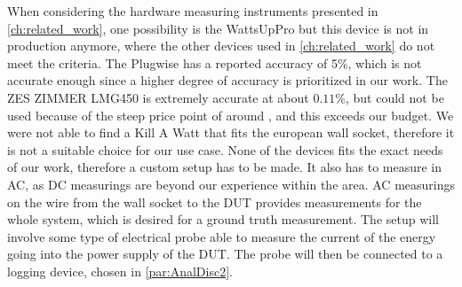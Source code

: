 When considering the hardware measuring instruments presented in \cref{ch:related_work}, one possibility is the WattsUpPro but this device is not in production anymore, where the other devices used in \cref{ch:related_work} do not meet the criteria. The Plugwise has a reported accuracy of 5\%\cite{PlugWise}, which is not accurate enough since a higher degree of accuracy is prioritized in our work. The ZES ZIMMER LMG450 is extremely accurate at about $0.11\%$\cite{hackenberg2013}, but could not be used because of the steep price point of around , and this exceeds our budget. We were not able to find a Kill A Watt\cite{KillAWatt} that fits the european wall socket, therefore it is not a suitable choice for our use case. None of the devices fits the exact needs of our work, therefore a custom setup has to be made. It also has to measure in AC, as DC measurings are beyond our experience within the area. AC measurings on the wire from the wall socket to the DUT provides measurements for the whole system, which is desired for a ground truth measurement. The setup will involve some type of electrical probe able to measure the current of the energy going into the power supply of the DUT. The probe will then be connected to a logging device, chosen in \cref{par:AnalDisc2}. 

